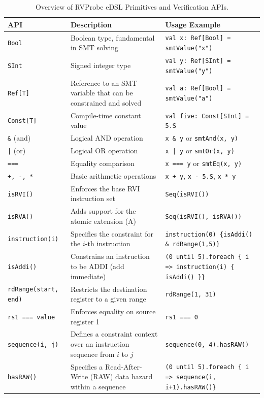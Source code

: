 \documentclass[sigconf]{acmart}
\begin{document}
\begin{table}[!tbp]
\centering
\renewcommand\tabcolsep{6.0pt}
\captionsetup{font=bf, skip=1em}
\caption{Overview of RVProbe eDSL Primitives and Verification APIs.}
\label{tab:api_summary}
\begin{tabular}{l>{\raggedright\arraybackslash}p{6.5cm}>{\raggedright\arraybackslash}p{6.5cm}}
\toprule
\textbf{API} & \textbf{Description} & \textbf{Usage Example} \\
\midrule
\texttt{Bool} & Boolean type, fundamental in SMT solving & \texttt{val x: Ref[Bool] = smtValue("x")} \\
\texttt{SInt} & Signed integer type & \texttt{val y: Ref[SInt] = smtValue("y")} \\
\midrule
\texttt{Ref[T]} & Reference to an SMT variable that can be constrained and solved & \texttt{val a: Ref[Bool] = smtValue("a")} \\
\texttt{Const[T]} & Compile-time constant value & \texttt{val five: Const[SInt] = 5.S} \\
\midrule
\texttt{\&} (and) & Logical AND operation & \texttt{x \& y} or \texttt{smtAnd(x, y)} \\
\texttt{|} (or) & Logical OR operation & \texttt{x | y} or \texttt{smtOr(x, y)} \\
\texttt{===} & Equality comparison & \texttt{x === y} or \texttt{smtEq(x, y)} \\
\texttt{+, -, *} & Basic arithmetic operations & \texttt{x + y}, \texttt{x - 5.S}, \texttt{x * y} \\
\midrule
\texttt{isRVI()} & Enforces the base RVI instruction set & \texttt{Seq(isRVI())} \\
\texttt{isRVA()} & Adds support for the atomic extension (A) & \texttt{Seq(isRVI(), isRVA())} \\
\midrule
\texttt{instruction(i)} & Specifies the constraint for the $i$-th instruction & \texttt{instruction(0) \{isAddi() \& rdRange(1,5)\}} \\
\midrule
\texttt{isAddi()} & Constrains an instruction to be ADDI (add immediate) & \texttt{(0 until 5).foreach \{ i => instruction(i) \{ isAddi() \}\}} \\
\midrule
\texttt{rdRange(start, end)} & Restricts the destination register to a given range & \texttt{rdRange(1, 31)}  \\
\texttt{rs1 === value} & Enforces equality on source register 1 & \texttt{rs1 === 0}  \\
\midrule
\texttt{sequence(i, j)} & Defines a constraint context over an instruction sequence from $i$ to $j$ & \texttt{sequence(0, 4).hasRAW()} \\
\texttt{hasRAW()} & Specifies a Read-After-Write (RAW) data hazard within a sequence & \texttt{(0 until 5).foreach \{ i => sequence(i, i+1).hasRAW()\}} \\
\bottomrule
\end{tabular}
\end{table}
\end{document}
